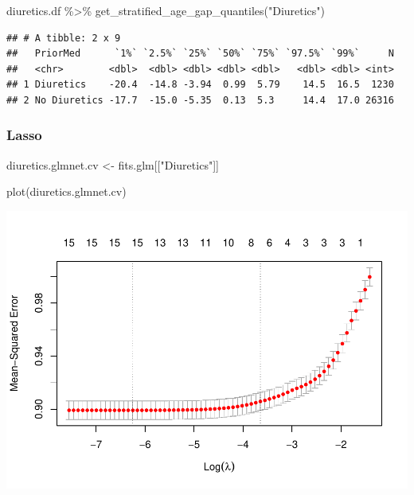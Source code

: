 \documentclass[
]{article}
\newenvironment{Shaded}{\begin{snugshade}}{\end{snugshade}}
\newcommand{\FunctionTok}[1]{\textcolor[rgb]{0.00,0.00,0.00}{#1}}
\newcommand{\NormalTok}[1]{#1}
\newcommand{\OtherTok}[1]{\textcolor[rgb]{0.56,0.35,0.01}{#1}}
\newcommand{\SpecialCharTok}[1]{\textcolor[rgb]{0.00,0.00,0.00}{#1}}
\newcommand{\StringTok}[1]{\textcolor[rgb]{0.31,0.60,0.02}{#1}}
\begin{document}
\begin{Shaded}
\begin{Highlighting}[]
\NormalTok{diuretics.df }\SpecialCharTok{\%\textgreater{}\%} 
 \FunctionTok{get\_stratified\_age\_gap\_quantiles}\NormalTok{(}\StringTok{"Diuretics"}\NormalTok{)}
\end{Highlighting}
\end{Shaded}

\begin{verbatim}
## # A tibble: 2 x 9
##   PriorMed      `1%` `2.5%` `25%` `50%` `75%` `97.5%` `99%`     N
##   <chr>        <dbl>  <dbl> <dbl> <dbl> <dbl>   <dbl> <dbl> <int>
## 1 Diuretics    -20.4  -14.8 -3.94  0.99  5.79    14.5  16.5  1230
## 2 No Diuretics -17.7  -15.0 -5.35  0.13  5.3     14.4  17.0 26316
\end{verbatim}

\hypertarget{lasso-7}{%
\subsubsection{Lasso}\label{lasso-7}}

\begin{Shaded}
\begin{Highlighting}[]
\NormalTok{diuretics.glmnet.cv }\OtherTok{\textless{}{-}}\NormalTok{ fits.glm[[}\StringTok{"Diuretics"}\NormalTok{]]}
\end{Highlighting}
\end{Shaded}

\begin{Shaded}
\begin{Highlighting}[]
\FunctionTok{plot}\NormalTok{(diuretics.glmnet.cv) }
\end{Highlighting}
\end{Shaded}

\includegraphics{../results/report_files/figure-latex/diuretics-lasso-plot-1.pdf}
\end{document}
